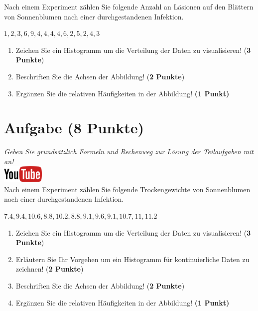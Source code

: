 \documentclass[a4paper, 10pt]{scrartcl}\usepackage[]{graphicx}\usepackage[]{xcolor}
\begin{document}
Nach einem Experiment z{\"a}hlen Sie folgende Anzahl an L{\"a}sionen auf den
Bl{\"a}ttern von Sonnenblumen nach einer durchgestandenen Infektion. 

\begin{center}
$1, 2, 3, 6, 9, 4, 4, 4, 4, 6, 2, 5, 2, 4, 3$
\end{center}

\begin{enumerate}
\item Zeichen Sie ein Histogramm um die Verteilung der Daten zu visualisieren! (\textbf{3 Punkte})
\item Beschriften Sie die Achsen der Abbildung! (\textbf{2 Punkte})
\item Erg{\"a}nzen Sie die relativen H{\"a}ufigkeiten in der Abbildung! \textbf{(1
    Punkt)}  
\end{enumerate}

 
\clearpage

\section{Aufgabe \hfill (8 Punkte)}

\textit{Geben Sie grunds{\"a}tzlich Formeln und Rechenweg zur L{\"o}sung der
  Teilaufgaben mit an!} \\[1Ex]

\hfill\href{https://youtu.be/ORHSPTCdfeY}{\includegraphics[width =
  2cm]{img/youtube}}\\[1Ex]



Nach einem Experiment z{\"a}hlen Sie folgende Trockengewichte von Sonnenblumen nach einer durchgestandenen Infektion. 

\begin{center}
$7.4, 9.4, 10.6, 8.8, 10.2, 8.8, 9.1, 9.6, 9.1, 10.7, 11, 11.2$
\end{center}

\begin{enumerate}
\item Zeichen Sie ein Histogramm um die Verteilung der Daten zu
  visualisieren! (\textbf{3 Punkte})
 \item Erl{\"a}utern Sie Ihr Vorgehen um ein Histogramm f{\"u}r kontinuierliche
  Daten zu zeichnen!  (\textbf{2 Punkte})
\item Beschriften Sie die Achsen der Abbildung! (\textbf{2 Punkte})
\item Erg{\"a}nzen Sie die relativen H{\"a}ufigkeiten in der Abbildung! \textbf{(1
    Punkt)}  
\end{enumerate}
\end{document}
